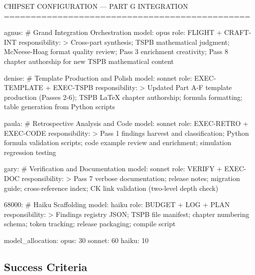 \documentclass[11pt,letterpaper]{article}
\begin{document}
\begin{asciibox}
CHIPSET CONFIGURATION --- PART G INTEGRATION
==============================================

agnus:              \# Grand Integration Orchestration
  model: opus
  role: FLIGHT + CRAFT-INT
  responsibility: >
    Cross-part synthesis; TSPB mathematical judgment; McNeese-Hoag
    format quality review; Pass 3 enrichment creativity; Pass 8
    chapter authorship for new TSPB mathematical content

denise:             \# Template Production and Polish
  model: sonnet
  role: EXEC-TEMPLATE + EXEC-TSPB
  responsibility: >
    Updated Part A-F template production (Passes 2-6);
    TSPB LaTeX chapter authorship; formula formatting;
    table generation from Python scripts

paula:              \# Retrospective Analysis and Code
  model: sonnet
  role: EXEC-RETRO + EXEC-CODE
  responsibility: >
    Pass 1 findings harvest and classification;
    Python formula validation scripts;
    code example review and enrichment;
    simulation regression testing

gary:               \# Verification and Documentation
  model: sonnet
  role: VERIFY + EXEC-DOC
  responsibility: >
    Pass 7 verbose documentation; release notes;
    migration guide; cross-reference index;
    CK link validation (two-level depth check)

68000:              \# Haiku Scaffolding
  model: haiku
  role: BUDGET + LOG + PLAN
  responsibility: >
    Findings registry JSON; TSPB file manifest;
    chapter numbering schema; token tracking;
    release packaging; compile script

model\_allocation:
  opus: 30%
  sonnet: 60%
  haiku: 10%
\end{asciibox}

\subsection{Success Criteria}
\end{document}
